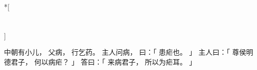
\switchcolumn[0]*[\section{}]

中朝有小儿，
父病，
行乞药。
主人问病，
曰：「
    患疟也。
」
主人曰：「
    尊侯明德君子，
    何以病疟？
」
答曰：「
    来病君子，
    所以为疟耳。
」

\switchcolumn



